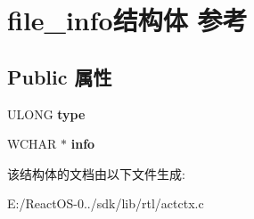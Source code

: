 \hypertarget{structfile__info}{}\section{file\+\_\+info结构体 参考}
\label{structfile__info}
\subsection*{Public 属性}
\begin{DoxyCompactItemize}
\item 
\mbox{\label{structfile__info_a354834001b5e4b92f776d490129c5a00}} 
U\+L\+O\+NG {\bfseries type}
\item 
\mbox{\label{structfile__info_ade2a67049a65bbe1f6212305d91a4886}} 
W\+C\+H\+AR $\ast$ {\bfseries info}
\end{DoxyCompactItemize}


该结构体的文档由以下文件生成\+:\begin{DoxyCompactItemize}
\item 
E\+:/\+React\+O\+S-\/0../sdk/lib/rtl/actctx.\+c\end{DoxyCompactItemize}
